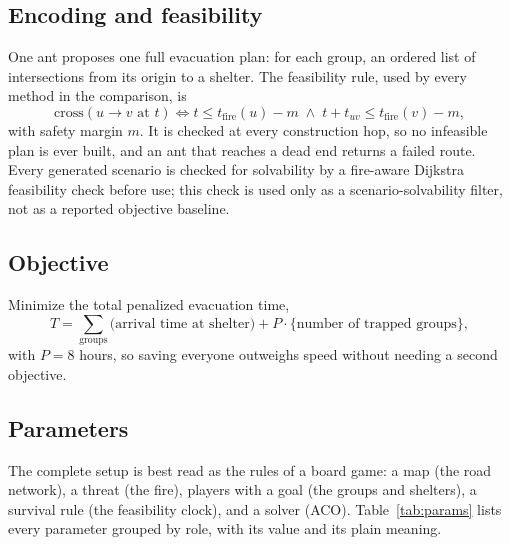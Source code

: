 \documentclass[11pt,a4paper]{article}
\begin{document}
\subsection{Encoding and feasibility}
One ant proposes one full evacuation plan: for each group, an ordered list of intersections from its origin to a shelter. The feasibility rule, used by every method in the comparison, is
\begin{equation}
\text{cross}(u \to v \text{ at } t) \iff
t \le t_{\text{fire}}(u) - m \;\wedge\; t + t_{uv} \le t_{\text{fire}}(v) - m,
\end{equation}
with safety margin $m$. It is checked at every construction hop, so no infeasible plan is ever built, and an ant that reaches a dead end returns a failed route. Every generated scenario is checked for solvability by a fire-aware Dijkstra feasibility check before use; this check is used only as a scenario-solvability filter, not as a reported objective baseline.

\subsection{Objective}
Minimize the total penalized evacuation time,
\begin{equation}
T = \sum_{\text{groups}} \big(\text{arrival time at shelter}\big)
+ P \cdot \{\text{number of trapped groups}\},
\end{equation}
with $P = 8$ hours, so saving everyone outweighs speed without needing a second objective.

\subsection{Parameters}
The complete setup is best read as the rules of a board game: a map (the road network), a threat (the fire), players with a goal (the groups and shelters), a survival rule (the feasibility clock), and a solver (ACO). Table~\ref{tab:params} lists every parameter grouped by role, with its value and its plain meaning.
\end{document}
